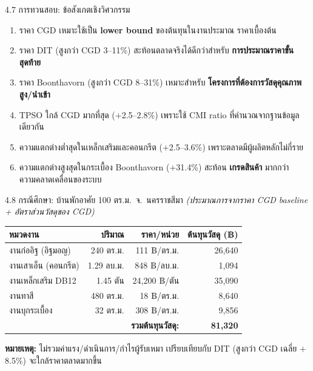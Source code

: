 \documentclass[aspectratio=169,11pt]{beamer}
\begin{document}
\begin{frame}{4.7 การทวนสอบ: ข้อสังเกตเชิงวิศวกรรม}
  \begin{enumerate}
    \item ราคา CGD เหมาะใช้เป็น \textbf{lower bound} ของต้นทุนในงานประมาณ
          ราคาเบื้องต้น
    \item ราคา DIT (สูงกว่า CGD 3--11\%) สะท้อนตลาดจริงได้ดีกว่าสำหรับ
          \textbf{การประมาณราคาขั้นสุดท้าย}
    \item ราคา Boonthavorn (สูงกว่า CGD 8--31\%) เหมาะสำหรับ
          \textbf{โครงการที่ต้องการวัสดุคุณภาพสูง/นำเข้า}
    \item TPSO ใกล้ CGD มากที่สุด ($+$2.5--2.8\%) เพราะใช้ CMI ratio
          ที่คำนวณจากฐานข้อมูลเดียวกัน
    \item ความแตกต่างต่ำสุดในเหล็กเสริมและคอนกรีต ($+$2.5--3.6\%)
          เพราะตลาดมีผู้ผลิตหลักไม่กี่ราย
    \item ความแตกต่างสูงสุดในกระเบื้อง Boonthavorn ($+$31.4\%) สะท้อน
          \textbf{เกรดสินค้า} มากกว่าความคลาดเคลื่อนของระบบ
  \end{enumerate}
\end{frame}

\begin{frame}{4.8 กรณีศึกษา: บ้านพักอาศัย 100 ตร.ม.\ จ.~นครราชสีมา}
  \footnotesize
  \textit{(ประมาณการจากราคา CGD baseline + อัตราส่วนวัสดุของ CGD)}
  \begin{table}
    \centering
    \begin{tabular}{lrrr}
      \toprule
      \textbf{หมวดงาน} & \textbf{ปริมาณ} & \textbf{ราคา/หน่วย} & \textbf{ต้นทุนวัสดุ (฿)} \\
      \midrule
      งานก่ออิฐ (อิฐมอญ)     & 240 ตร.ม.    & 111 ฿/ตร.ม.    & 26{,}640 \\
      งานเสาเอ็น (คอนกรีต)   & 1.29 ลบ.ม.   & 848 ฿/ลบ.ม.    & 1{,}094 \\
      งานเหล็กเสริม DB12     & 1.45 ตัน     & 24{,}200 ฿/ตัน  & 35{,}090 \\
      งานทาสี                & 480 ตร.ม.    & 18 ฿/ตร.ม.     & 8{,}640 \\
      งานบุกระเบื้อง         & 32 ตร.ม.     & 308 ฿/ตร.ม.    & 9{,}856 \\
      \midrule
      \multicolumn{3}{r}{\textbf{รวมต้นทุนวัสดุ:}} & \textbf{81{,}320} \\
      \bottomrule
    \end{tabular}
  \end{table}
  \vspace{0.3em}
  \footnotesize\textbf{หมายเหตุ:} ไม่รวมค่าแรง/ดำเนินการ/กำไรผู้รับเหมา
  เปรียบเทียบกับ DIT (สูงกว่า CGD เฉลี่ย $+$8.5\%) จะใกล้ราคาตลาดมากขึ้น
\end{frame}
\end{document}
